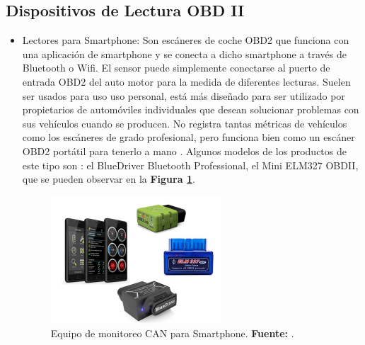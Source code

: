 \subsection{Dispositivos de Lectura OBD II}
\begin{itemize}
	\item Lectores para Smartphone: Son escáneres de coche OBD2 que funciona con una aplicación de smartphone y se conecta a dicho smartphone a través de Bluetooth o Wifi. El sensor puede simplemente conectarse al puerto de entrada OBD2 del auto motor para la medida de diferentes lecturas. Suelen ser usados para uso uso personal,  está más diseñado para ser utilizado por propietarios de automóviles individuales que desean solucionar problemas con sus vehículos cuando se producen. No registra tantas métricas de vehículos como los escáneres de grado profesional, pero funciona bien como un escáner OBD2 portátil para tenerlo a mano \cite{cite_obd0_c3} .  Algunos modelos de los productos de este tipo son : el BlueDriver Bluetooth Professional, el Mini ELM327 OBDII,  que se pueden observar en la \textbf{Figura \ref{fig_obd1_c3}}.
	
	
	
	
	
	\begin{figure}[H]
		\centering
		\includegraphics[width=0.6\textwidth]{./Cap3imagen/BlueDriver.JPG}
		\caption[Equipo de monitoreo CAN para Smartphone.]{Equipo de monitoreo CAN para Smartphone.\textbf{ Fuente:} \cite{cite_obd0_c3}.}
		\label{fig_obd1_c3} %
	\end{figure}
	

\end{itemize}
